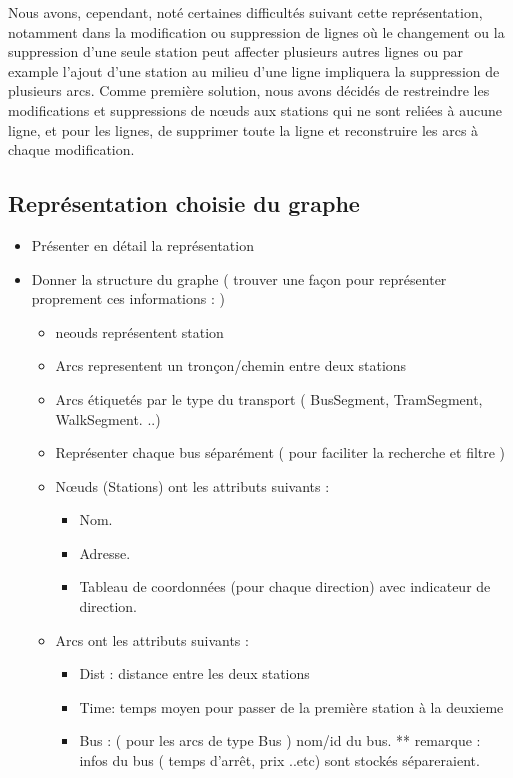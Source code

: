 \begin{itemize}
	Nous avons, cependant, noté certaines difficultés suivant cette représentation, notamment dans la modification ou suppression de lignes où le changement ou la suppression d'une seule station peut affecter plusieurs autres lignes ou par example l'ajout d'une station au milieu d'une ligne impliquera la suppression de plusieurs arcs.
	Comme première solution, nous avons décidés de restreindre les modifications et suppressions de nœuds aux stations qui ne sont reliées à aucune ligne, et pour les lignes, de supprimer toute la ligne et reconstruire les arcs à chaque modification.
	     
\end{itemize}
\subsection{Représentation choisie du graphe}
	\begin{itemize}
	\item Présenter en détail la représentation
	\item Donner la structure du graphe ( trouver une façon pour représenter proprement ces informations : )
	\begin{itemize}
		 \item  neouds représentent station
		 \item Arcs representent un tronçon/chemin entre deux stations
		 \item Arcs étiquetés par le type du transport ( BusSegment, TramSegment, WalkSegment. ..) 
		 \item Représenter chaque bus séparément ( pour faciliter la recherche et filtre ) 
		 \item Nœuds (Stations) ont les attributs suivants : 
		 \begin{itemize}
		 	\item Nom.
		 	\item Adresse.
		 	\item Tableau de coordonnées (pour chaque direction) avec indicateur de direction.
		 \end{itemize}
		 \item Arcs ont les attributs suivants :
		 \begin{itemize}
		 		\item Dist : distance entre les deux stations
		 		\item Time: temps moyen pour passer de la première station à la deuxieme
		 		\item Bus : ( pour les arcs de type Bus ) nom/id du bus.
		 		** remarque : infos du bus ( temps d'arrêt, prix ..etc) sont stockés sépareraient.
		 \end{itemize}
	\end{itemize}
	\end{itemize}


